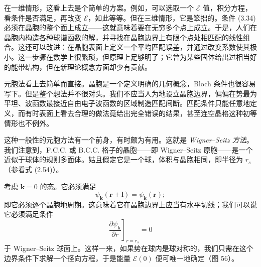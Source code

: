 在一维情形，这看上去是个简单的方案。例如，可以选取一个 $\mathcal{E}$ 值，积分方程，看条件是否满足，再改变 $\mathcal{E}$，如此等等。但在三维情形，它是笨拙的。条件 (3.34) 必须在晶胞的整个面上成立——这就意味着要在无穷多个点上成立。于是，人们在晶胞内构造各种球谐函数的解，并寻找在晶胞边界上有限个点处相匹配的线性组合。这还可以改进：在晶胞表面上定义一个平均匹配误差，并通过改变系数使其极小。这一步骤在数学上很繁琐，但原理上足够明了；它曾为某些固体给出过相当好的能带结构，但在新理论概念方面却少有贡献。

元胞法看上去简单而直接。晶胞是一个定义明确的几何概念，Bloch 条件也很容易写下。但是整个想法并不很对头。我们不应当人为地设立晶胞边界，偏偏在势最为平坦、波函数最接近自由电子波函数的区域制造匹配间断。匹配条件只能任意地定义，而有时表面上看去合理的做法竟给出完全错误的结果，甚至连空晶格这种初等情形也不例外。

这种一般性的元胞方法有一个前身，有时颇为有用。这就是 \emph{Wigner--Seitz 方法}。我们注意到，F.C.C. 或 B.C.C. 格子的晶胞——即 Wigner--Seitz 原胞——是一个近似于球体的规则多面体。姑且假定它是一个球，体积与晶胞相同，即半径为 $r_s$（参看式 (2.54)）。

考虑 $\mathbf{k}=0$ 的态。它必须满足
\begin{equation*}
\psi_{\mathbf{k}}(\mathbf{r}+\mathbf{l})=\psi_{\mathbf{k}}(\mathbf{r});
\tag{3.36}
\end{equation*}
即它必须逐个晶胞地周期。这意味着它在晶胞边界上应当有水平切线；我们可以说它必须满足条件
\begin{equation*}
\left.\frac{\partial\psi_{\mathbf{k}}}{\partial r}\right]_{r=r_s}=0
\tag{3.37}
\end{equation*}
于 Wigner--Seitz 球面上。这样一来，如果势在球内是球对称的，我们只需在这个边界条件下求解一个径向方程，于是能量 $\mathcal{E}(0)$ 便可唯一地确定（图 56）。


